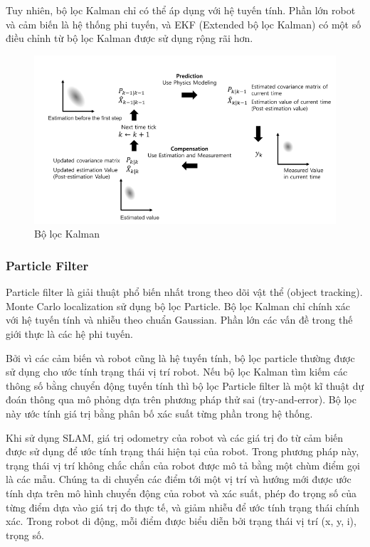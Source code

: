 {{Tuy nhiên, bộ lọc Kalman chỉ có thể áp dụng với hệ tuyến tính. Phần lớn robot và cảm biến là hệ thống phi tuyến, và EKF (Extended bộ lọc Kalman) có một số điều chỉnh từ bộ lọc Kalman được sử dụng rộng rãi hơn.


\begin{figure}[htbp]
  \centering
  \includegraphics[width=\linewidth]{figures/BasicConceptKalmanFilter.png}
  \caption{Bộ lọc Kalman\cite{pyo2017ros}}
  \label{fig:BasicConceptKalmanFilter}
\end{figure}

\subsubsection*{Particle Filter}
Particle filter là giải thuật phổ biến nhất trong theo dõi vật thể (object tracking). Monte Carlo localization sử dụng bộ lọc Particle. Bộ lọc Kalman chỉ chính xác với hệ tuyến tính và nhiễu theo chuẩn Gaussian. Phần lớn các vấn đề trong thế giới thực là các hệ phi tuyến.

Bởi vì các cảm biến và robot cũng là hệ tuyến tính, bộ lọc particle thường được sử dụng cho ước tính trạng thái vị trí robot. Nếu bộ lọc Kalman tìm kiếm các thông số bằng chuyển động tuyến tính thì bộ lọc Particle filter là một kĩ thuật dự đoán thông qua mô phỏng dựa trên phương pháp thử sai (try-and-error). Bộ lọc này ước tính giá trị bằng phân bố xác suất từng phần trong hệ thống.

Khi sử dụng SLAM, giá trị odometry của robot và các giá trị đo từ cảm biến được sử dụng để ước tính trạng thái hiện tại của robot. Trong phương pháp này, trạng thái vị trí không chắc chắn của robot được mô tả bằng một chùm điểm gọi là các mẫu. Chúng ta di chuyển các điểm tới một vị trí và hướng mới được ước tính dựa trên mô hình chuyển động của robot và xác suất, phép đo trọng số của từng điểm dựa vào giá trị đo thực tế, và giảm nhiễu để ước tính trạng thái chính xác. Trong robot di động, mỗi điểm được biểu diễn bởi trạng thái vị trí (x, y, i), trọng số.

}}
